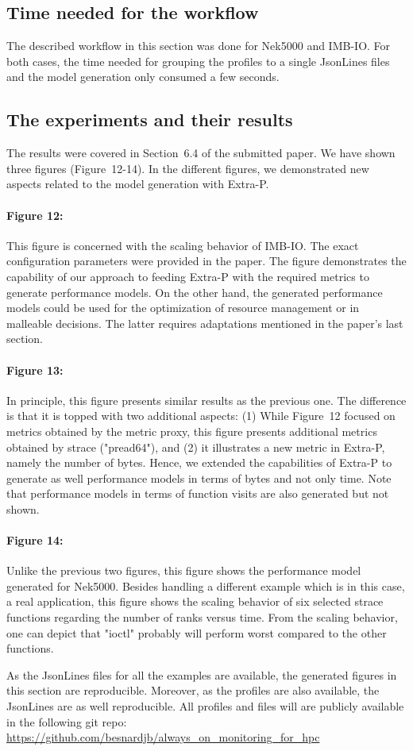 \subsection{Time needed for the workflow}
The described workflow in this section was done for Nek5000 and IMB-IO. For both cases, the 
time needed for grouping the profiles to a single JsonLines files and the model generation 
only consumed a few seconds. 

\subsection{The experiments and their results}
The results were covered in Section~6.4 of the submitted paper. We have shown three 
figures (Figure~12-14). In the different figures, we demonstrated new aspects related 
to the model generation with Extra-P.
\paragraph*{\textbf{Figure 12:}} This figure is concerned with the scaling behavior of IMB-IO. 
The exact configuration parameters were provided in the paper. The figure demonstrates the capability 
of our approach to feeding Extra-P with the required metrics to generate performance models. On the 
other hand, the generated performance models could be used for the optimization of resource management or 
in malleable decisions. The latter requires adaptations mentioned in the paper's last section.  

\paragraph*{\textbf{Figure 13:}}
In principle, this figure presents similar results as the previous one. The difference is that it is topped with 
two additional aspects: (1) While Figure~12 focused on metrics obtained by the metric proxy, this figure presents 
additional metrics obtained by strace ("pread64"), and (2) it illustrates a new metric in Extra-P, namely the number of bytes. 
Hence, we extended the capabilities of Extra-P to generate as well performance models in terms of bytes and not only time. 
Note that performance models in terms of function visits are also generated but not shown. 

\paragraph*{\textbf{Figure 14:}}
Unlike the previous two figures, this figure shows the performance model generated for Nek5000. 
Besides handling a different example which is in this case, a real application, this figure shows the 
scaling behavior of six selected strace functions regarding the number of ranks versus time. From the 
scaling behavior, one can depict that "ioctl" probably will perform worst compared to the other functions. 

As the JsonLines files for all the examples are available, the generated figures in this section are 
reproducible. Moreover, as the profiles are also available, the JsonLines are as well reproducible. All 
profiles and files will are publicly available in the following git repo: \url{https://github.com/besnardjb/always_on_monitoring_for_hpc}